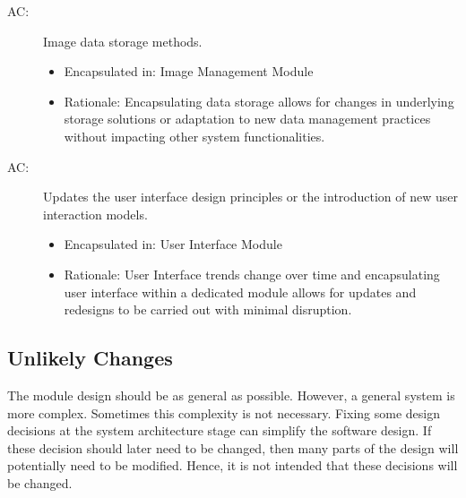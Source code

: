 \documentclass[12pt, titlepage]{article}
\newcounter{acnum}
\newcommand{\actheacnum}{AC\theacnum}
\begin{document}
\begin{description}
\item[ \actheacnum \label{5_ac}:] Image data storage methods.
\begin{itemize}
    \item Encapsulated in: Image Management Module
    \item Rationale: Encapsulating data storage allows for changes in underlying storage solutions or adaptation to new data management practices without impacting other system functionalities.
\end{itemize}

\item[ \actheacnum \label{6_ac}:] Updates the user interface design principles or the introduction of new user interaction models.
\begin{itemize}
    \item Encapsulated in: User Interface Module
    \item Rationale: User Interface trends change over time and encapsulating user interface within a dedicated module allows for updates and redesigns to be carried out with minimal disruption.
\end{itemize}
\end{description}

\subsection{Unlikely Changes} \label{SecUchange}

The module design should be as general as possible. However, a general system is more complex. Sometimes this complexity is not necessary. Fixing some design decisions at the system architecture stage can simplify the software design. If these decision should later need to be changed, then many parts of the design will potentially need to be modified. Hence, it is not intended that these decisions will be changed.
\end{document}
